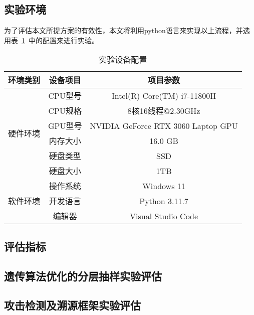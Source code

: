 \subsection{实验环境}
为了评估本文所提方案的有效性，本文将利用python语言来实现以上流程，并选用表~\ref{tab:env_setting}~中的配置来进行实验。
\begin{table}[htbp]
  \caption{实验设备配置}
  \label{tab:env_setting}
  \centering
  \begin{tabular}{ccc}
    \toprule
    \textbf{环境类别} & \textbf{设备项目} & \textbf{项目参数}\\
    \midrule
    \multirow{6}{*}{硬件环境}& CPU型号 & Intel(R) Core(TM) i7-11800H\\
                            & CPU规格 & 8核16线程@2.30GHz\\
                            & GPU型号 & NVIDIA GeForce RTX 3060 Laptop GPU\\
                            & 内存大小& 16.0 GB\\
                            & 硬盘类型& SSD\\
                            & 硬盘大小& 1TB\\
                            \hline
    \multirow{3}{*}{软件环境}&操作系统&Windows 11\\
                            &开发语言&Python 3.11.7\\
                            &编辑器 &Visual Studio Code\\                       
    \bottomrule
  \end{tabular}
\end{table}

\subsection{评估指标}

\subsection{遗传算法优化的分层抽样实验评估}

\subsection{攻击检测及溯源框架实验评估}
